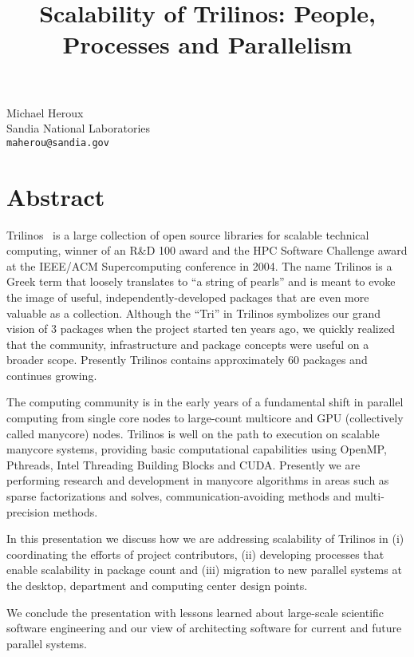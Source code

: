\title{Scalability of Trilinos: People, Processes and Parallelism}
\author{} \institute{}
\maketitle

\begin{center}
{\large Michael Heroux}\\
Sandia National Laboratories\\
{\tt maherou@sandia.gov}
\end{center}

\section*{Abstract}
Trilinos~\cite{trilinoshomepage,Trilinos-Overview-TOMS} is a large collection of open source libraries for scalable technical computing, winner of an R\&D 100 award and the HPC Software Challenge award at the IEEE/ACM Supercomputing conference in 2004.  The name Trilinos is a Greek term that loosely translates to ``a string of pearls'' and is meant to evoke the image of useful, independently-developed packages that are even more valuable as a collection.  Although the ``Tri'' in Trilinos symbolizes our grand vision of 3 packages when the project started ten years ago, we quickly realized that the community, infrastructure and package concepts were useful on a broader scope.  Presently Trilinos contains approximately 60 packages and continues growing.  

The computing community is in the early years of a fundamental shift in parallel computing from single core nodes to large-count multicore and GPU (collectively called manycore) nodes.  Trilinos is well on the path to execution on scalable manycore systems, providing basic computational capabilities using OpenMP, Pthreads, Intel Threading Building Blocks and CUDA.  Presently we are performing research and development in manycore algorithms in areas such as sparse factorizations and solves, communication-avoiding methods and multi-precision methods.

In this presentation we discuss how we are addressing scalability of Trilinos in (i) coordinating the efforts of project contributors, (ii) developing processes that enable scalability in package count and (iii) migration to new parallel systems at the desktop, department and computing center design points.

We conclude the presentation with lessons learned about large-scale scientific software engineering and our view of architecting software for current and future parallel systems.

